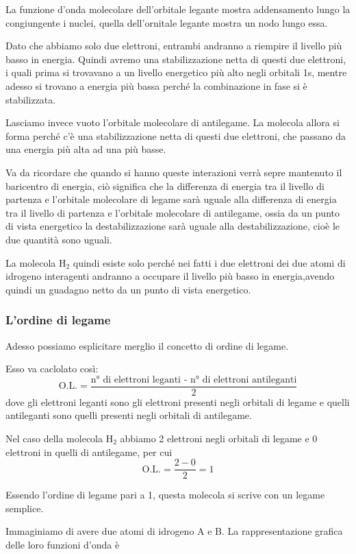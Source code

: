 La funzione d'onda molecolare dell'orbitale legante mostra addensamento lungo la congiungente i nuclei, quella dell'ornitale legante mostra un nodo lungo essa.

\vspace{0.2cm}Dato che abbiamo solo due elettroni, entrambi andranno a riempire il livello più basso in energia. Quindi avremo una stabilizzazione netta di questi due elettroni, i quali prima si trovavano a un livello energetico più alto negli orbitali 1s, mentre adesso si trovano a energia più bassa perché la combinazione in fase si è stabilizzata.

Lasciamo invece vuoto l'orbitale molecolare di antilegame.
La molecola allora si forma perché c'è una stabilizzazione netta di questi due elettroni, che passano da una energia più alta ad una più basse.

Va da ricordare che quando si hanno queste interazioni verrà sepre mantenuto il baricentro di energia, ciò significa che la differenza di energia tra il livello di partenza e l'orbitale molecolare di legame sarà uguale alla differenza di energia tra il livello di partenza e l'orbitale molecolare di antilegame, ossia da un punto di vista energetico la destabilizzazione sarà uguale alla destabilizzazione, cioè le due quantità sono uguali.

La molecola H$_2$ quindi esiste solo perché nei fatti i due elettroni dei due atomi di idrogeno interagenti andranno a occupare il livello più basso in energia,avendo quindi un guadagno netto da un punto di vista energetico.

\subsubsection{L'ordine di legame}
Adesso possiamo esplicitare merglio il concetto di ordine di legame.

Esso va caclolato così:
$$\text{O.L.}=\frac{\text{n° di elettroni leganti - n° di elettroni antileganti}}{2}$$
dove gli elettroni leganti sono gli elettroni presenti negli orbitali di legame e quelli antileganti sono quelli presenti negli orbitali di antilegame.

Nel caso della molecola H$_2$ abbiamo 2 elettroni negli orbitali di legame e 0 elettroni in quelli di antilegame, per cui
$$\text{O.L.}=\frac{2-0}{2}=1$$

Essendo l'ordine di legame pari a 1, questa molecola si scrive con un legame semplice.

\vspace{0.2cm}Immaginiamo di avere due atomi di idrogeno A e B. La rappresentazione grafica delle loro funzioni d'onda è

